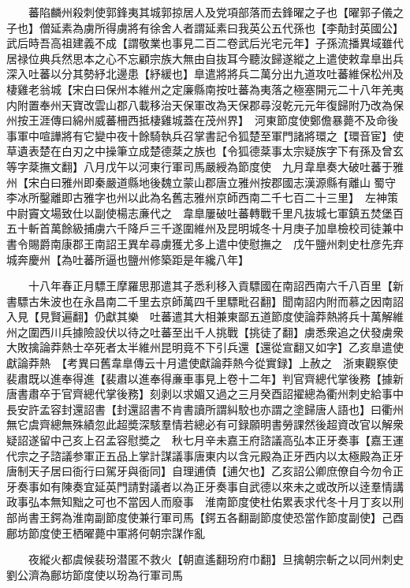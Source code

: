 　　蕃陷麟州殺刺使郭鋒夷其城郭掠居人及党項部落而去鋒曜之子也【曜郭子儀之子也】僧延素為虜所得虜將有徐舍人者謂延素曰我英公五代孫也【李勣封英國公】武后時吾高祖建義不成【謂敬業也事見二百二卷武后光宅元年】子孫流播異域雖代居禄位典兵然思本之心不忘顧宗族大無由自抜耳今聽汝歸遂縱之上遣使敕韋臯出兵深入吐蕃以分其勢紓北邊患【紓緩也】臯遣將將兵二萬分出九道攻吐蕃維保松州及棲雞老翁城【宋白曰保州本維州之定廉縣南按吐蕃為夷落之極塞開元二十八年羌夷内附置奉州天寶改雲山郡八載移治天保軍改為天保郡尋沒乾元元年復歸附乃改為保州按王涯傳曰綿州威蕃柵西抵棲雞城蓋在茂州界】　河東節度使鄭儋暴薨不及命後事軍中喧譁將有它變中夜十餘騎執兵召掌書記令狐楚至軍門諸將環之【環音宦】使草遺表楚在白刃之中操筆立成楚德棻之族也【令狐德棻事太宗疑族字下有孫及曾玄等字棻撫文翻】八月戊午以河東行軍司馬嚴綬為節度使　九月韋臯奏大破吐蕃于雅州【宋白曰雅州即秦嚴道縣地後魏立蒙山郡唐立雅州按郡國志漢源縣有離山蜀守李冰所鑿離即古雅字也州以此為名舊志雅州京師西南二千七百二十三里】　左神策中尉竇文場致仕以副使楊志亷代之　韋臯屢破吐蕃轉戰千里凡抜城七軍鎮五焚堡百五十斬首萬餘級捕虜六千降戶三千遂圍維州及昆明城冬十月庚子加臯檢校司徒兼中書令賜爵南康郡王南詔王異牟尋虜獲尤多上遣中使慰撫之　戊午鹽州刺史杜彦先弃城奔慶州【為吐蕃所逼也鹽州修築距是年纔八年】

　　十八年春正月驃王摩羅思那遣其子悉利移入貢驃國在南詔西南六千八百里【新書驃古朱波也在永昌南二千里去京師萬四千里驃毗召翻】聞南詔内附而慕之因南詔入見【見賢遍翻】仍獻其樂　吐蕃遣其大相兼東鄙五道節度使論莽熱將兵十萬解維州之圍西川兵據險設伏以待之吐蕃至出千人挑戰【挑徒了翻】虜悉衆追之伏發虜衆大敗擒論莽熱士卒死者太半維州昆明竟不下引兵還【還從宣翻又如字】乙亥臯遣使獻論莽熱　【考異曰舊韋臯傳云十月遣使獻論莽熱今從實録】上赦之　浙東觀察使裴肅既以進奉得進【裴肅以進奉得亷車事見上卷十二年】判官齊總代掌後務【據新唐書肅卒于官齊總代掌後務】刻剥以求媚又過之三月癸酉詔擢總為衢州刺史給事中長安許孟容封還詔書【封還詔書不肯書讀所謂糾駮也亦謂之塗歸唐人語也】曰衢州無它虞齊總無殊績忽此超奬深駭羣情若總必有可録願明書勞課然後超資改官以解衆疑詔遂留中己亥上召孟容慰奬之　秋七月辛未嘉王府諮議高弘本正牙奏事【嘉王運代宗之子諮議参軍正五品上掌計謀議事唐東内以含元殿為正牙西内以太極殿為正牙唐制天子居曰衙行曰駕牙與衙同】自理逋債【逋欠也】乙亥詔公卿庶僚自今勿令正牙奏事如有陳奏宜延英門請對議者以為正牙奏事自武德以來未之或改所以逹羣情講政事弘本無知黜之可也不當因人而廢事　淮南節度使杜佑累表求代冬十月丁亥以刑部尚書王鍔為淮南副節度使兼行軍司馬【鍔五各翻副節度使恐當作節度副使】己酉鄜坊節度使王栖曜薨中軍將何朝宗謀作亂

　　夜縱火都虞候裴玢潜匿不救火【朝直遙翻玢府巾翻】旦擒朝宗斬之以同州刺史劉公濟為鄜坊節度使以玢為行軍司馬

